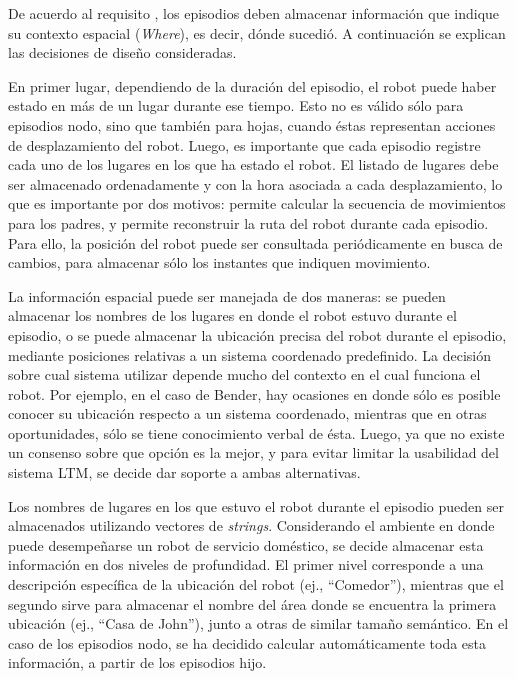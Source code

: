 De acuerdo al requisito , los episodios deben almacenar información que indique su contexto espacial (\textit{Where}), es decir, dónde sucedió. A continuación se explican las decisiones de diseño consideradas.

En primer lugar, dependiendo de la duración del episodio, el robot puede haber estado en más de un lugar durante ese tiempo. Esto no es válido sólo para episodios nodo, sino que también para hojas, cuando éstas representan acciones de desplazamiento del robot. Luego, es importante que cada episodio registre cada uno de los lugares en los que ha estado el robot. El listado de lugares debe ser almacenado ordenadamente y con la hora asociada a cada desplazamiento, lo que es importante por dos motivos: permite calcular la secuencia de movimientos para los padres, y permite reconstruir la ruta del robot durante cada episodio. Para ello, la posición del robot puede ser consultada periódicamente en busca de cambios, para almacenar sólo los instantes que indiquen movimiento.


La información espacial puede ser manejada de dos maneras: se pueden almacenar los nombres de los lugares en donde el robot estuvo durante el episodio, o se puede almacenar la ubicación precisa del robot durante el episodio, mediante posiciones relativas a un sistema coordenado predefinido. La decisión sobre cual sistema utilizar depende mucho del contexto en el cual funciona el robot. Por ejemplo, en el caso de Bender, hay ocasiones en donde sólo es posible conocer su ubicación respecto a un sistema coordenado, mientras que en otras oportunidades, sólo se tiene conocimiento verbal de ésta. Luego, ya que no existe un consenso sobre que opción es la mejor, y para evitar limitar la usabilidad del sistema LTM, se decide dar soporte a ambas alternativas.


Los nombres de lugares en los que estuvo el robot durante el episodio pueden ser almacenados utilizando vectores de \textit{strings}. Considerando el ambiente en donde puede desempeñarse un robot de servicio doméstico, se decide almacenar esta información en dos niveles de profundidad. El primer nivel corresponde a una descripción específica de la ubicación del robot (ej., ``Comedor''), mientras que el segundo sirve para almacenar el nombre del área donde se encuentra la primera ubicación (ej., ``Casa de John''), junto a otras de similar tamaño semántico. En el caso de los episodios nodo, se ha decidido calcular automáticamente toda esta información, a partir de los episodios hijo.

